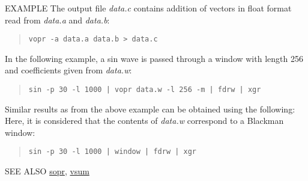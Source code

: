 \begin{options}
\end{options}

\begin{qsection}{EXAMPLE}
The output file {\em data.c} contains addition of
vectors in float format read from {\em data.a} and {\em data.b}:
\begin{quote}
  \verb!vopr -a data.a data.b > data.c !
\end{quote}
\par
In the following example, a sin wave is passed through
a window with length 256 and coefficients given from
{\em data.w}:
\begin{quote}
  \verb!sin -p 30 -l 1000 | vopr data.w -l 256 -m | fdrw | xgr!
\end{quote}
Similar results as from the above example can be obtained using the following:
 Here, it is considered that the contents of {\em data.w} correspond to a Blackman window:
\begin{quote}
  \verb!sin -p 30 -l 1000 | window | fdrw | xgr!
\end{quote}
\end{qsection}

\begin{qsection}{SEE ALSO}
\hyperlink{sopr}{sopr},
\hyperlink{vsum}{vsum}
\end{qsection}
